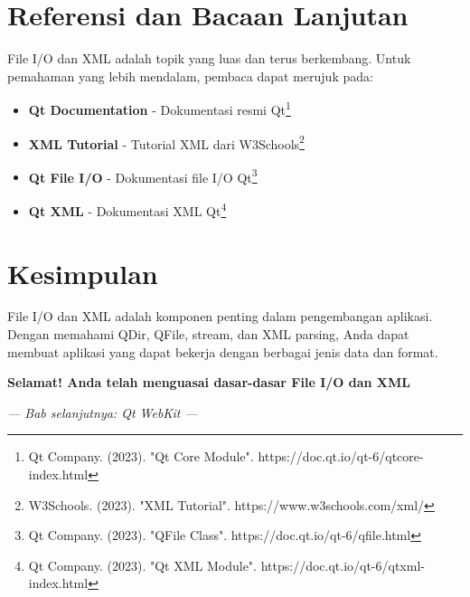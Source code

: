 \section{Referensi dan Bacaan Lanjutan}

File I/O dan XML adalah topik yang luas dan terus berkembang. Untuk pemahaman yang lebih mendalam, pembaca dapat merujuk pada:

\begin{itemize}
\item \textbf{Qt Documentation} - Dokumentasi resmi Qt\footnote{Qt Company. (2023). "Qt Core Module". https://doc.qt.io/qt-6/qtcore-index.html}
\item \textbf{XML Tutorial} - Tutorial XML dari W3Schools\footnote{W3Schools. (2023). "XML Tutorial". https://www.w3schools.com/xml/}
\item \textbf{Qt File I/O} - Dokumentasi file I/O Qt\footnote{Qt Company. (2023). "QFile Class". https://doc.qt.io/qt-6/qfile.html}
\item \textbf{Qt XML} - Dokumentasi XML Qt\footnote{Qt Company. (2023). "Qt XML Module". https://doc.qt.io/qt-6/qtxml-index.html}
\end{itemize}

\section{Kesimpulan}

File I/O dan XML adalah komponen penting dalam pengembangan aplikasi. Dengan memahami QDir, QFile, stream, dan XML parsing, Anda dapat membuat aplikasi yang dapat bekerja dengan berbagai jenis data dan format.

\begin{center}
\textbf{Selamat! Anda telah menguasai dasar-dasar File I/O dan XML}
\end{center}

\vspace{1cm}

\begin{center}
\textit{--- Bab selanjutnya: Qt WebKit ---}
\end{center}
